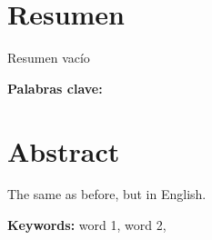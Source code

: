 \chapter*{Resumen}
\thispagestyle{empty}

Resumen vacío

\bigskip

\textbf{Palabras clave:} \thesisKeywords

\clearpage
\chapter*{Abstract}
\thispagestyle{empty}

The same as before, but in English.

\bigskip

\textbf{Keywords:} word 1, word 2, 

\cleardoublepage

